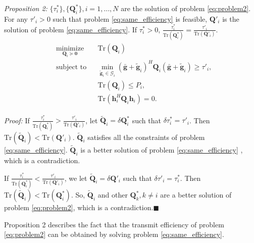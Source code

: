 \documentclass[journal]{IEEEtran}
\begin{document}
\emph{Proposition 2:} $\{\tau_i^*\}, \{\mathbf{Q}_i^*\}, i = 1, \ldots, N$ are the solution of problem \eqref{eq:problem2}. For any $ \tau'_i > 0$ such that problem \eqref{eq:same_efficiency} is feasible, $ \mathbf{Q}'_i$ is the solution of problem \eqref{eq:same_efficiency}. If $\tau_i^* > 0$, $\frac{\tau_i^*}{\text{Tr}(\mathbf{Q}_i^*)} = \frac{\tau'_i}{\text{Tr}(\mathbf{Q}'_i)}$.
\begin{eqnarray}\label{eq:same_efficiency}
\begin{aligned} 
& \underset{\mathbf{Q}_i \succeq \mathbf{0}}{\text{minimize}}
& & \text{Tr}(\mathbf{Q}_i)\\
& \text{subject to}
& & \min_{\tilde{\mathbf{g}}_i \in \mathcal{G}_i}(\bar{\mathbf{g}}+\tilde{\mathbf{g}}_i)^H\mathbf{Q}_i(\bar{\mathbf{g}}+\tilde{\mathbf{g}}_i) \geq \tau'_i,\\
&&& \text{Tr}\left(\mathbf{Q}_i\right) \leq P_i,\\ 
&&&\text{Tr}\left(\mathbf{h}_i^H\mathbf{Q}_i\mathbf{h}_i\right) = 0.
\end{aligned}
\end{eqnarray}

\emph{Proof:} If $\frac{\tau_i^*}{\text{Tr}(\mathbf{Q}_i^*)} > \frac{\tau'_i}{\text{Tr}(\mathbf{Q}'_i)}$, let $\tilde{\mathbf{Q}}_i = \delta\mathbf{Q}_i^ *$ such that $\delta\tau_i^* = \tau'_i$. Then $\text{Tr}(\tilde{\mathbf{Q}}_i) < \text{Tr}(\mathbf{Q}'_i)$. $\tilde{\mathbf{Q}}_i$ satisfies all the constraints of problem \eqref{eq:same_efficiency}. $\tilde{\mathbf{Q}}_i$  is a better solution of problem \eqref{eq:same_efficiency} , which is a contradiction.

If $\frac{\tau_i^*}{\text{Tr}(\mathbf{Q}_i^*)} < \frac{\tau'_i}{\text{Tr}(\mathbf{Q}'_i)}$, we let $\tilde{\mathbf{Q}}_i = \delta\mathbf{Q}'_i$ such that $\delta\tau'_i = \tau_i^*$. Then $\text{Tr}(\tilde{\mathbf{Q}}_i) < \text{Tr}(\mathbf{Q}^*_i)$. So,  $\tilde{\mathbf{Q}}_i$ and other $\mathbf{Q}_k^*, k \neq i$ are a better solution of problem \eqref{eq:problem2}, which is a contradiction.$\blacksquare$

Proposition 2 describes the fact that the transmit efficiency of problem \eqref{eq:problem2} can be obtained by solving problem \eqref{eq:same_efficiency}.
\end{document}
